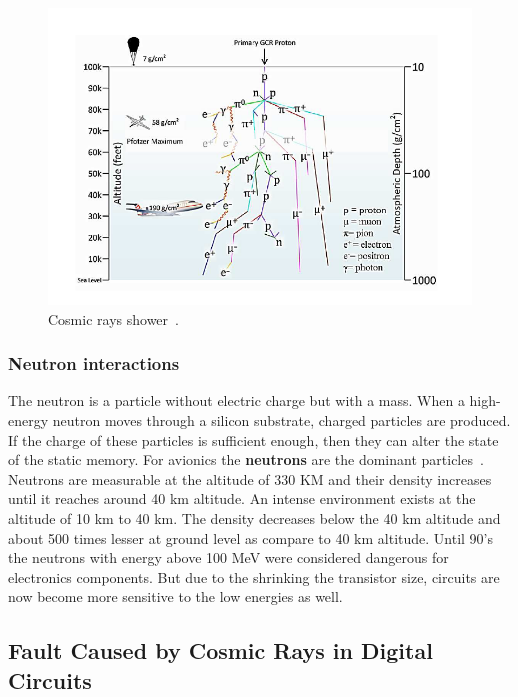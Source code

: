 \begin{figure}[h]
 \centering
  \captionsetup{justification=centering}    
   \includegraphics[scale=0.75]{Figures/showerplusaircraft.png}
  \caption{Cosmic rays shower~\cite{ziegler1996ibm}.}
\label{shower}
\end{figure}


\subsubsection{Neutron interactions}



The neutron is a particle without electric charge but with a mass. When a high-energy neutron moves through a silicon substrate, charged particles are produced. If the charge of these particles is sufficient enough, then they can alter the state of the static memory.  For avionics the \textbf{neutrons} are the dominant particles~\citep{xilinnseu}. Neutrons are measurable at the altitude of 330 KM and their density increases until it reaches around 40 km altitude. An intense environment exists at the altitude of 10 km to 40 km. The density decreases below the 40 km altitude and about 500 times lesser at ground level as compare to 40 km altitude. Until 90's the neutrons with energy above 100 MeV were considered dangerous for electronics components. But due to the shrinking the transistor size, circuits are now become more sensitive to the low energies as well.   

\subsection{Fault Caused by Cosmic Rays in Digital Circuits}


